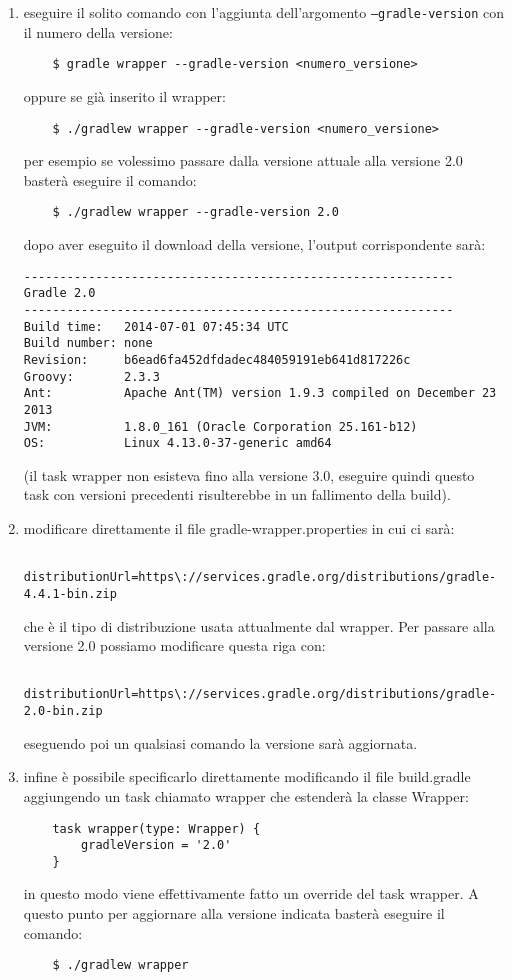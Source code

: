 \begin{enumerate}
    \item eseguire il solito comando con l'aggiunta dell'argomento \texttt{--gradle-version} con il numero della versione:
\begin{verbatim}
    $ gradle wrapper --gradle-version <numero_versione> \end{verbatim}
oppure se già inserito il wrapper:
\begin{verbatim}
    $ ./gradlew wrapper --gradle-version <numero_versione> \end{verbatim}
per esempio se volessimo passare dalla versione attuale alla versione 2.0 basterà eseguire il comando:
\begin{verbatim}
    $ ./gradlew wrapper --gradle-version 2.0 \end{verbatim}
dopo aver eseguito il download della versione, l'output corrispondente sarà:
\begin{verbatim}
------------------------------------------------------------
Gradle 2.0
------------------------------------------------------------
Build time:   2014-07-01 07:45:34 UTC
Build number: none
Revision:     b6ead6fa452dfdadec484059191eb641d817226c
Groovy:       2.3.3
Ant:          Apache Ant(TM) version 1.9.3 compiled on December 23 2013
JVM:          1.8.0_161 (Oracle Corporation 25.161-b12)
OS:           Linux 4.13.0-37-generic amd64
\end{verbatim}
(il task wrapper non esisteva fino alla versione 3.0, eseguire quindi questo task con versioni precedenti risulterebbe in un fallimento della build).
    \item modificare direttamente il file gradle-wrapper.properties in cui ci sarà:
\begin{verbatim}
    distributionUrl=https\://services.gradle.org/distributions/gradle-4.4.1-bin.zip \end{verbatim}
    che è il tipo di distribuzione usata attualmente dal wrapper. Per passare alla versione 2.0 possiamo modificare questa riga con:
\begin{verbatim}
    distributionUrl=https\://services.gradle.org/distributions/gradle-2.0-bin.zip \end{verbatim}
    eseguendo poi un qualsiasi comando la versione sarà aggiornata.
    \item infine è possibile specificarlo direttamente modificando il file build.gradle aggiungendo un task chiamato wrapper che estenderà la classe Wrapper:
\begin{verbatim}
    task wrapper(type: Wrapper) {
        gradleVersion = '2.0'
    } \end{verbatim}
    in questo modo viene effettivamente fatto un override del task wrapper. A questo punto per aggiornare alla versione indicata basterà eseguire il comando:
\begin{verbatim}
    $ ./gradlew wrapper \end{verbatim}
    
\end{enumerate}
